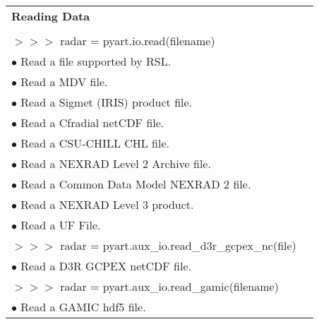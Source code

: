 \documentclass[potrait,a0paper,fontscale=0.33]{baposter} %
\begin{document}
\begin{poster}
{\begin{flushleft}
\begin{tabular}{@{}ll@{}}
\multicolumn{2}{l}{\cellcolor[HTML]{DDFFFF}\bf Reading Data} \\
\\
$>$$>$$>$ radar = pyart.io.read(filename)\\
\-\hspace{0.4cm} $\bullet$ Read a file supported by RSL.\\
\-\hspace{0.4cm} $\bullet$ Read a MDV file.\\
\-\hspace{0.4cm} $\bullet$ Read a Sigmet (IRIS) product file.\\
\-\hspace{0.4cm} $\bullet$ Read a Cfradial netCDF file.\\
\-\hspace{0.4cm} $\bullet$ Read a CSU-CHILL CHL file.\\
\-\hspace{0.4cm} $\bullet$ Read a NEXRAD Level 2 Archive file.\\
\-\hspace{0.4cm} $\bullet$ Read a Common Data Model NEXRAD 2 file.\\
\-\hspace{0.4cm} $\bullet$ Read a NEXRAD Level 3 product.\\
\-\hspace{0.4cm} $\bullet$ Read a UF File.\\
$>$$>$$>$ radar = pyart.aux\_io.read\_d3r\_gcpex\_nc(file)\\
\-\hspace{0.4cm} $\bullet$ Read a D3R GCPEX netCDF file.\\
$>$$>$$>$ radar = pyart.aux\_io.read\_gamic(filename)\\
\-\hspace{0.4cm} $\bullet$ Read a GAMIC hdf5 file.\\
\end{tabular}
\end{flushleft}
}


\end{poster}
\end{document}

